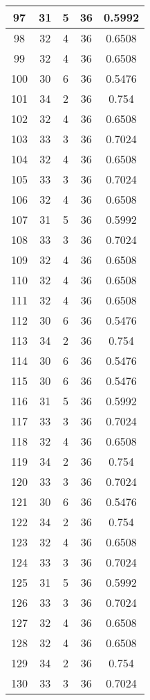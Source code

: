 \documentclass[letterpaper, 12pt]{article}
\begin{document}
\begin{longtable}{|c|c|c|c|c|}
\hline
97 & 31 & 5 & 36 & 0.5992 \\
\hline
98 & 32 & 4 & 36 & 0.6508 \\
\hline
99 & 32 & 4 & 36 & 0.6508 \\
\hline
100 & 30 & 6 & 36 & 0.5476 \\
\hline
101 & 34 & 2 & 36 & 0.754 \\
\hline
102 & 32 & 4 & 36 & 0.6508 \\
\hline
103 & 33 & 3 & 36 & 0.7024 \\
\hline
104 & 32 & 4 & 36 & 0.6508 \\
\hline
105 & 33 & 3 & 36 & 0.7024 \\
\hline
106 & 32 & 4 & 36 & 0.6508 \\
\hline
107 & 31 & 5 & 36 & 0.5992 \\
\hline
108 & 33 & 3 & 36 & 0.7024 \\
\hline
109 & 32 & 4 & 36 & 0.6508 \\
\hline
110 & 32 & 4 & 36 & 0.6508 \\
\hline
111 & 32 & 4 & 36 & 0.6508 \\
\hline
112 & 30 & 6 & 36 & 0.5476 \\
\hline
113 & 34 & 2 & 36 & 0.754 \\
\hline
114 & 30 & 6 & 36 & 0.5476 \\
\hline
115 & 30 & 6 & 36 & 0.5476 \\
\hline
116 & 31 & 5 & 36 & 0.5992 \\
\hline
117 & 33 & 3 & 36 & 0.7024 \\
\hline
118 & 32 & 4 & 36 & 0.6508 \\
\hline
119 & 34 & 2 & 36 & 0.754 \\
\hline
120 & 33 & 3 & 36 & 0.7024 \\
\hline
121 & 30 & 6 & 36 & 0.5476 \\
\hline
122 & 34 & 2 & 36 & 0.754 \\
\hline
123 & 32 & 4 & 36 & 0.6508 \\
\hline
124 & 33 & 3 & 36 & 0.7024 \\
\hline
125 & 31 & 5 & 36 & 0.5992 \\
\hline
126 & 33 & 3 & 36 & 0.7024 \\
\hline
127 & 32 & 4 & 36 & 0.6508 \\
\hline
128 & 32 & 4 & 36 & 0.6508 \\
\hline
129 & 34 & 2 & 36 & 0.754 \\
\hline
130 & 33 & 3 & 36 & 0.7024 \\

\end{longtable}
\end{document}
